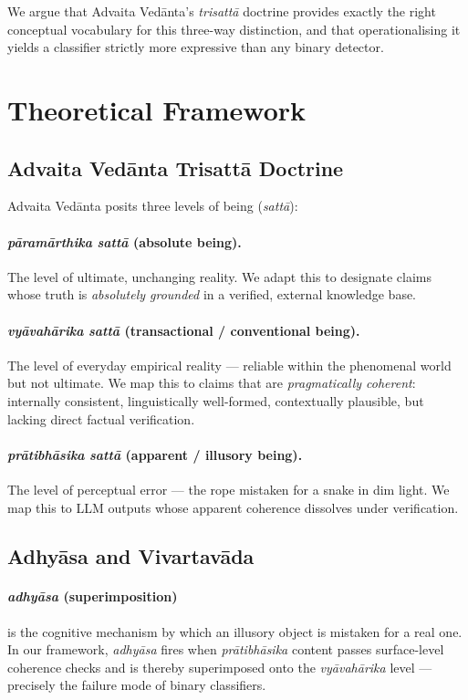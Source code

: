 \documentclass[11pt]{article}
\newcommand{\param}{\textcolor{paramcol}{\textit{pāramārthika}}}
\newcommand{\vyav}{\textcolor{vyavcol}{\textit{vyāvahārika}}}
\newcommand{\prati}{\textcolor{praticol}{\textit{prātibhāsika}}}
\newcommand{\adhyasa}{\textcolor{adhyasacol}{\textit{adhyāsa}}}
\newcommand{\trisatta}{\textit{trisattā}}
\newcommand{\satta}{\textit{sattā}}
\begin{document}
We argue that Advaita Ved\={a}nta's \trisatta{} doctrine provides exactly the
right conceptual vocabulary for this three-way distinction, and that
operationalising it yields a classifier strictly more expressive than any binary
detector.

\section{Theoretical Framework}
\label{sec:theory}

\subsection{Advaita Vedānta Trisattā Doctrine}

Advaita Ved\={a}nta posits three levels of being (\satta{}):

\paragraph{\param{} \satta{} (absolute being).}
The level of ultimate, unchanging reality. We adapt this to designate claims
whose truth is \emph{absolutely grounded} in a verified, external knowledge base.

\paragraph{\vyav{} \satta{} (transactional / conventional being).}
The level of everyday empirical reality --- reliable within the phenomenal world
but not ultimate. We map this to claims that are \emph{pragmatically coherent}:
internally consistent, linguistically well-formed, contextually plausible, but
lacking direct factual verification.

\paragraph{\prati{} \satta{} (apparent / illusory being).}
The level of perceptual error --- the rope mistaken for a snake in dim light.
We map this to LLM outputs whose apparent coherence dissolves under verification.

\subsection{Adhyāsa and Vivartavāda}

\paragraph{\adhyasa{} (superimposition)} is the cognitive mechanism by which an
illusory object is mistaken for a real one. In our framework, \adhyasa{} fires
when \prati{} content passes surface-level coherence checks and is thereby
superimposed onto the \vyav{} level --- precisely the failure mode of binary
classifiers.
\end{document}
